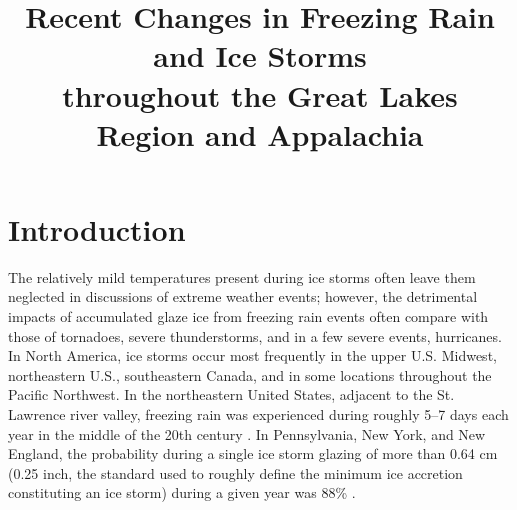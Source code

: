 \documentclass[twocol]{ametsoc}
\title{Recent Changes in Freezing Rain and Ice Storms\\ throughout the Great Lakes Region and Appalachia}
\affiliation{Department of Climate and Space Sciences and Engineering, University of Michigan, Ann Arbor, Michigan}
\begin{document}

\maketitle








%

\section{Introduction}

The relatively mild temperatures present during ice storms often leave them neglected in discussions of extreme weather events; however, the detrimental impacts of accumulated glaze ice from freezing rain events often compare with those of tornadoes, severe thunderstorms, and in a few severe events, hurricanes.  In North America, ice storms occur most frequently in the upper U.S. Midwest, northeastern U.S., southeastern Canada, and in some locations throughout the Pacific Northwest. In the northeastern United States, adjacent to the St. Lawrence river valley, freezing rain was experienced during roughly 5--7 days each year in the middle of the 20th century \citep{changnon2003temporal}. In Pennsylvania, New York, and New England, the probability during a single ice storm glazing of more than 0.64 cm (0.25 inch, the standard used to roughly define the minimum ice accretion constituting an ice storm) during a given year was 88\% \citep{nwsglossary,tattelman1973estimated}. 
\end{document}
